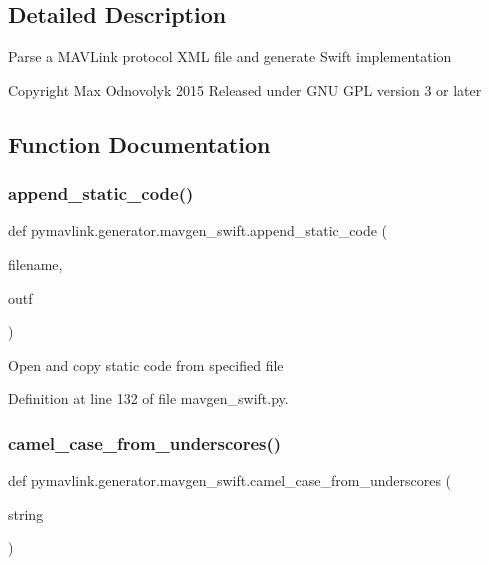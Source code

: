 \subsection{Detailed Description}
\begin{DoxyVerb}Parse a MAVLink protocol XML file and generate Swift implementation

Copyright Max Odnovolyk 2015
Released under GNU GPL version 3 or later
\end{DoxyVerb}
 

\subsection{Function Documentation}
\mbox{\label{namespacepymavlink_1_1generator_1_1mavgen__swift_a44b1af0ce3b6338825d40002eb8dd76a}} 
\subsubsection{\texorpdfstring{append\_static\_code()}{append\_static\_code()}}
{\footnotesize\ttfamily def pymavlink.\+generator.\+mavgen\+\_\+swift.\+append\+\_\+static\+\_\+code (\begin{DoxyParamCaption}\item[{}]{filename,  }\item[{}]{outf }\end{DoxyParamCaption})}

\begin{DoxyVerb}Open and copy static code from specified file\end{DoxyVerb}
 

Definition at line 132 of file mavgen\+\_\+swift.\+py.

\mbox{\label{namespacepymavlink_1_1generator_1_1mavgen__swift_a3be145e5779805512d208e0a874649f5}} 
\subsubsection{\texorpdfstring{camel\_case\_from\_underscores()}{camel\_case\_from\_underscores()}}
{\footnotesize\ttfamily def pymavlink.\+generator.\+mavgen\+\_\+swift.\+camel\+\_\+case\+\_\+from\+\_\+underscores (\begin{DoxyParamCaption}\item[{}]{string }\end{DoxyParamCaption})}

